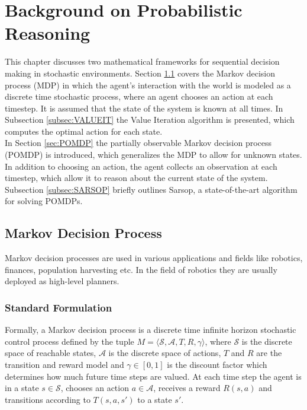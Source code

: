 \chapter{Background on Probabilistic Reasoning}
\label{chap:probabilistic}

This chapter discusses two mathematical frameworks for sequential decision making in stochastic environments. Section \ref{sec:MDP} covers the Markov decision process (MDP) in which the agent's interaction with the world is modeled as a discrete time stochastic process, where an agent chooses an action at each timestep. It is assumed that the state of the system is known at all times. In Subsection \ref{subsec:VALUEIT} the Value Iteration algorithm is presented, which computes the optimal action for each state.\\

In Section \ref{sec:POMDP} the partially observable Markov decision process (POMDP) is introduced, which generalizes the MDP to allow for unknown states. In addition to choosing an action, the agent collects an observation at each timestep, which allow it to reason about the current state of the system. Subsection \ref{subsec:SARSOP} briefly outlines Sarsop, a state-of-the-art algorithm for solving POMDPs.  
\section{Markov Decision Process}\label{sec:MDP}
Markov decision processes are used in various applications and fields like robotics, finances, population harvesting \cite{MDPsurvey} etc. In the field of robotics they are usually deployed as high-level planners. 
\subsection{Standard Formulation}\label{subsec:MDPFormulation}
Formally, a Markov decision process is a discrete time infinite horizon stochastic control process defined by the tuple $M = \langle \mathcal{S}, \mathcal{A}, T, R, \gamma \rangle$, where $\mathcal{S}$ is the discrete space of reachable states, $\mathcal{A}$ is the discrete space of actions, $T$ and $R$ are the transition and reward model and $\gamma \in [0,1]$ is the discount factor which determines how much future time steps are valued. At each time step the agent is in a state $s\in\mathcal{S}$, chooses an action $a\in\mathcal{A}$, receives a reward $R(s,a)$ and transitions according to $T(s,a,s')$ to a state $s'$.\\


